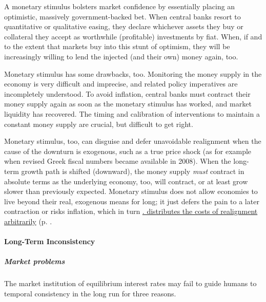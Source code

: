 A monetary stimulus bolsters market confidence by essentially placing an optimistic, massively government-backed bet. When central banks resort to quantitative or qualitative easing, they declare whichever assets they buy or collateral they accept as worthwhile (profitable) investments by fiat. When, if and to the extent that markets buy into this stunt of optimism, they will be increasingly willing to lend the injected (and their own) money again, too.

Monetary stimulus has some drawbacks, too. Monitoring the money supply in the economy is very difficult and imprecise, and related policy imperatives are incompletely understood. To avoid inflation, central banks must contract their money supply again as soon as the monetary stimulus has worked, and market liquidity has recovered. The timing and calibration of interventions to maintain a constant money supply are crucial, but difficult to get right. 

Monetary stimulus, too, can disguise and defer unavoidable realignment when the cause of the downturn is exogenous, such as a true price shock (as for example when revised Greek fiscal numbers became available in 2008). When the long-term growth path is shifted (downward), the money supply \emph{must} contract in absolute terms as the underlying economy, too, will contract, or at least grow slower than previously expected. Monetary stimulus does not allow economies to live beyond their real, exogenous means for long; it just defers the pain to a later contraction or risks inflation, which in turn \hyperref[sec:distributive_effects_of_inflation]{. distributes the costs of realignment arbitrarily} (p. \pageref{sec:distributive_effects_of_inflation}. 


\paragraph{Long-Term Inconsistency} \label{sec:long-term_inconsistency}

\subparagraph{Market problems} The market institution of equilibrium interest rates may fail to guide humans to temporal consistency in the long run for three reasons.

